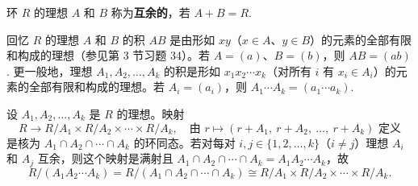\begin{definition}
环 \(R\) 的理想 \(A\) 和 \(B\) 称为\textbf{互余的}，若 \(A + B = R\).
\end{definition}

回忆 \(R\) 的理想 \(A\) 和 \(B\) 的积 \(AB\) 是由形如 \(xy\)（\(x \in A\)、\(y \in B\)）的元素的全部有限和构成的理想（参见第 3 节习题 34）。若 \(A = (a)\)、\(B = (b)\)，则 \(AB = (ab)\). 更一般地，理想 \(A_1, A_2, \ldots, A_k\) 的积是形如 \(x_1x_2\cdots x_k\)（对所有 \(i\) 有 \(x_i \in A_i\)）的元素的全部有限和构成的理想。若 \(A_i = (a_i)\)，则 \(A_1\cdots A_k = (a_1\cdots a_k)\).

\begin{theorem}[中国剩余定理]\label{thm:7.17}
设 \(A_1, A_2, \ldots, A_k\) 是 \(R\) 的理想。映射
\[
R \to R/A_1 \times R/A_2 \times \cdots \times R/A_k, \quad \text{由 } r \mapsto (r+A_1,\ r+A_2,\ \ldots,\ r+A_k) \text{ 定义}
\]
是核为 \(A_1 \cap A_2 \cap \cdots \cap A_k\) 的环同态。若对每对 \(i, j \in \{1, 2, \ldots, k\}\)（\(i \neq j\)）理想 \(A_i\) 和 \(A_j\) 互余，则这个映射是满射且 \(A_1 \cap A_2 \cap \cdots \cap A_k = A_1A_2\cdots A_k\)，故
\[
R/(A_1A_2\cdots A_k) = R/(A_1 \cap A_2 \cap \cdots \cap A_k) \cong R/A_1 \times R/A_2 \times \cdots \times R/A_k.
\]
\end{theorem}

